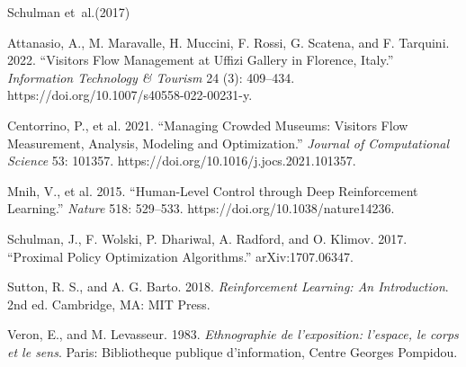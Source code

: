 \documentclass[11pt]{article}
\numberwithin{equation}{section} %
\begin{document}
\clearpage
\begin{thebibliography}{Schulman et~al.(2017)}

Attanasio, A., M. Maravalle, H. Muccini, F. Rossi, G. Scatena, and F. Tarquini. 2022.
``Visitors Flow Management at Uffizi Gallery in Florence, Italy.''
\emph{Information Technology \& Tourism} 24 (3): 409--434.
https://doi.org/10.1007/s40558-022-00231-y.

Centorrino, P., et al. 2021.
``Managing Crowded Museums: Visitors Flow Measurement, Analysis, Modeling and Optimization.''
\emph{Journal of Computational Science} 53: 101357.
https://doi.org/10.1016/j.jocs.2021.101357.

Mnih, V., et al. 2015.
``Human-Level Control through Deep Reinforcement Learning.''
\emph{Nature} 518: 529--533.
https://doi.org/10.1038/nature14236.

Schulman, J., F. Wolski, P. Dhariwal, A. Radford, and O. Klimov. 2017.
``Proximal Policy Optimization Algorithms.''
arXiv:1707.06347.

Sutton, R. S., and A. G. Barto. 2018.
\emph{Reinforcement Learning: An Introduction}. 2nd ed.
Cambridge, MA: MIT Press.

Veron, E., and M. Levasseur. 1983.
\emph{Ethnographie de l'exposition: l'espace, le corps et le sens}.
Paris: Bibliotheque publique d'information, Centre Georges Pompidou.

\end{thebibliography}
\end{document}
